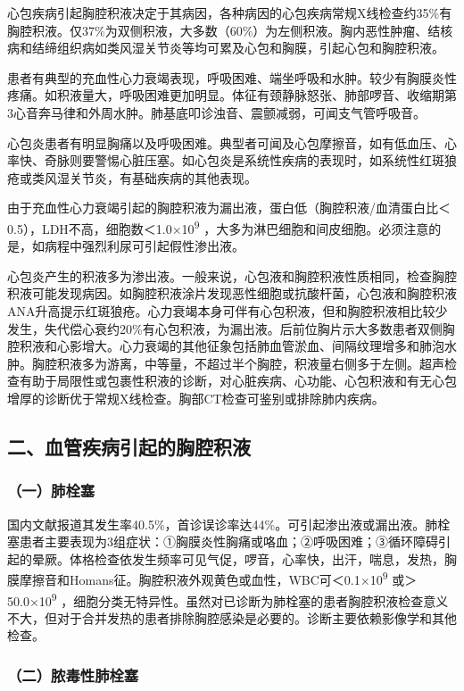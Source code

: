 心包疾病引起胸腔积液决定于其病因，各种病因的心包疾病常规X线检查约35\%有胸腔积液。仅37\%为双侧积液，大多数（60\%）为左侧积液。胸内恶性肿瘤、结核病和结缔组织病如类风湿关节炎等均可累及心包和胸膜，引起心包和胸腔积液。

患者有典型的充血性心力衰竭表现，呼吸困难、端坐呼吸和水肿。较少有胸膜炎性疼痛。如积液量大，呼吸困难更加明显。体征有颈静脉怒张、肺部啰音、收缩期第3心音奔马律和外周水肿。肺基底叩诊浊音、震颤减弱，可闻支气管呼吸音。

心包炎患者有明显胸痛以及呼吸困难。典型者可闻及心包摩擦音，如有低血压、心率快、奇脉则要警惕心脏压塞。如心包炎是系统性疾病的表现时，如系统性红斑狼疮或类风湿关节炎，有基础疾病的其他表现。

由于充血性心力衰竭引起的胸腔积液为漏出液，蛋白低（胸腔积液/血清蛋白比＜0.5），LDH不高，细胞数＜1.0×10\textsuperscript{9}
，大多为淋巴细胞和间皮细胞。必须注意的是，如病程中强烈利尿可引起假性渗出液。

心包炎产生的积液多为渗出液。一般来说，心包液和胸腔积液性质相同，检查胸腔积液可能发现病因。如胸腔积液涂片发现恶性细胞或抗酸杆菌，心包液和胸腔积液ANA升高提示红斑狼疮。心力衰竭本身可伴有心包积液，但和胸腔积液相比较少发生，失代偿心衰约20\%有心包积液，为漏出液。后前位胸片示大多数患者双侧胸腔积液和心影增大。心力衰竭的其他征象包括肺血管淤血、间隔纹理增多和肺泡水肿。胸腔积液多为游离，中等量，不超过半个胸腔，积液量右侧多于左侧。超声检查有助于局限性或包裹性积液的诊断，对心脏疾病、心功能、心包积液和有无心包增厚的诊断优于常规X线检查。胸部CT检查可鉴别或排除肺内疾病。

\subsection{二、血管疾病引起的胸腔积液}

\subsubsection{（一）肺栓塞}

国内文献报道其发生率40.5\%，首诊误诊率达44\%。可引起渗出液或漏出液。肺栓塞患者主要表现为3组症状：①胸膜炎性胸痛或咯血；②呼吸困难；③循环障碍引起的晕厥。体格检查依发生频率可见气促，啰音，心率快，出汗，喘息，发热，胸膜摩擦音和Homans征。胸腔积液外观黄色或血性，WBC可＜0.1×10\textsuperscript{9}
或＞50.0×10\textsuperscript{9}
，细胞分类无特异性。虽然对已诊断为肺栓塞的患者胸腔积液检查意义不大，但对于合并发热的患者排除胸腔感染是必要的。诊断主要依赖影像学和其他检查。

\subsubsection{（二）脓毒性肺栓塞}

